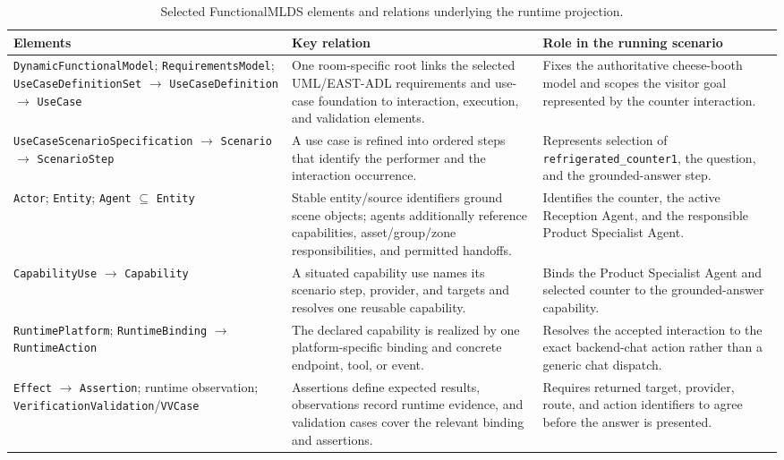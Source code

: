 \begin{table}[h]
  \caption{Selected FunctionalMLDS elements and relations underlying the
  runtime projection.}
  \label{tab:functionalmlds-relations}
  \small
  \begin{tabularx}{\textwidth}{@{}p{37mm}Y Y@{}}
    \toprule
    Elements & Key relation & Role in the running scenario \\
    \midrule
    \texttt{DynamicFunctionalModel}; \texttt{RequirementsModel};
    \texttt{UseCaseDefinitionSet} $\rightarrow$
    \texttt{UseCaseDefinition} $\rightarrow$ \texttt{UseCase}
      & One room-specific root links the selected UML/EAST-ADL requirements and
        use-case foundation to interaction, execution, and validation elements.
      & Fixes the authoritative cheese-booth model and scopes the visitor goal
        represented by the counter interaction. \\
    \texttt{UseCaseScenarioSpecification} $\rightarrow$
    \texttt{Scenario} $\rightarrow$ \texttt{ScenarioStep}
      & A use case is refined into ordered steps that identify the performer and
        the interaction occurrence.
      & Represents selection of \texttt{refrigerated\_counter1}, the question,
        and the grounded-answer step. \\
    \texttt{Actor}; \texttt{Entity};
    \texttt{Agent} $\subseteq$ \texttt{Entity}
      & Stable entity/source identifiers ground scene objects; agents additionally
        reference capabilities, asset/group/zone responsibilities, and permitted
        handoffs.
      & Identifies the counter, the active Reception Agent, and the responsible
        Product Specialist Agent. \\
    \texttt{CapabilityUse} $\rightarrow$ \texttt{Capability}
      & A situated capability use names its scenario step, provider, and targets
        and resolves one reusable capability.
      & Binds the Product Specialist Agent and selected counter to the
        grounded-answer capability. \\
    \texttt{RuntimePlatform}; \texttt{RuntimeBinding} $\rightarrow$
    \texttt{RuntimeAction}
      & The declared capability is realized by one platform-specific binding and
        concrete endpoint, tool, or event.
      & Resolves the accepted interaction to the exact backend-chat action rather
        than a generic chat dispatch. \\
    \texttt{Effect} $\rightarrow$ \texttt{Assertion}; runtime observation;
    \texttt{VerificationValidation}/\texttt{VVCase}
      & Assertions define expected results, observations record runtime evidence,
        and validation cases cover the relevant binding and assertions.
      & Requires returned target, provider, route, and action identifiers to agree
        before the answer is presented. \\
    \bottomrule
  \end{tabularx}
\end{table}
\FloatBarrier
\clearpage

